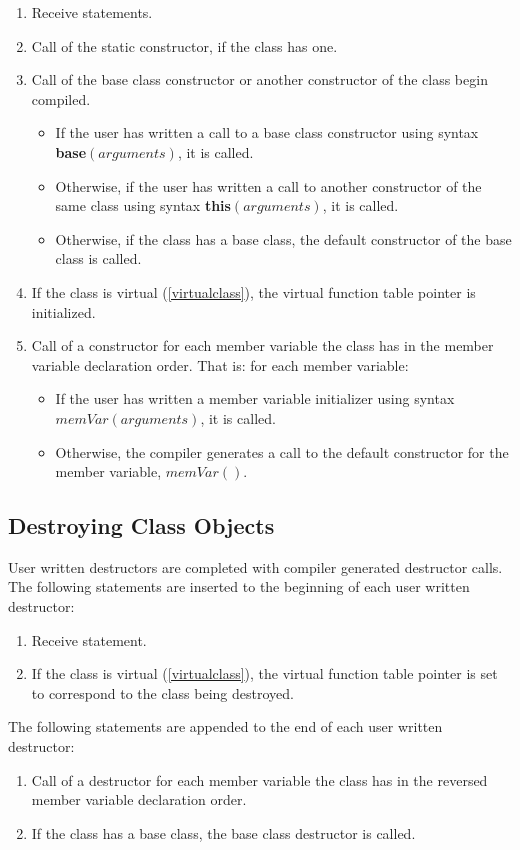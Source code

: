 \documentclass[a4paper,oneside,11pt]{book}
\theoremstyle{definition}
\begin{document}
\begin{enumerate}
\item
Receive statements.
\item
Call of the static constructor, if the class has one.
\item
Call of the base class constructor or another constructor of the class begin compiled.
\begin{itemize}
\item
If the user has written a call to a base class constructor using syntax \textbf{base}$(arguments)$, it is called.
\item
Otherwise, if the user has written a call to another constructor of the same class using syntax \textbf{this}$(arguments)$, it is called.
\item
Otherwise, if the class has a base class, the default constructor of the base class is called.
\end{itemize}
\item
If the class is virtual (\ref{virtualclass}), the virtual function table pointer is initialized.
\item
Call of a constructor for each member variable the class has in the member variable declaration order.
That is: for each member variable:
\begin{itemize}
\item
If the user has written a member variable initializer using syntax $memVar(arguments)$, it is called.
\item
Otherwise, the compiler generates a call to the default constructor for the member variable, $memVar()$.
\end{itemize}
\end{enumerate}

\subsection{Destroying Class Objects}

User written destructors are completed with compiler generated destructor calls.
The following statements are inserted to the beginning of each user written destructor:
\begin{enumerate}
\item
Receive statement.
\item
If the class is virtual (\ref{virtualclass}), the virtual function table pointer is set to correspond to the class being destroyed.
\end{enumerate}
The following statements are appended to the end of each user written destructor:
\begin{enumerate}
\item
Call of a destructor for each member variable the class has in the reversed member variable declaration order.
\item
If the class has a base class, the base class destructor is called.
\end{enumerate}
\end{document}
